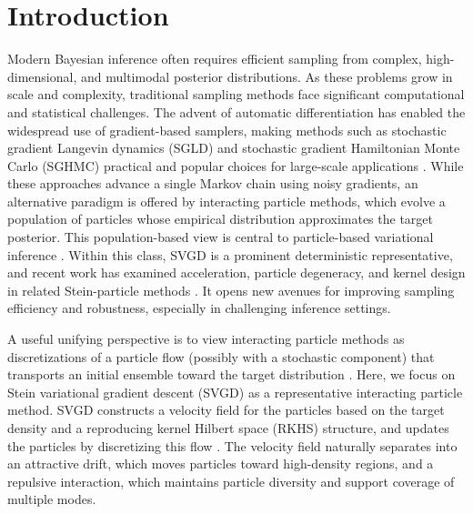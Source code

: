 \section{Introduction}

\label{sec:introduction}

Modern Bayesian inference often requires efficient sampling from complex, high-dimensional, and multimodal posterior distributions. As these problems grow in scale and complexity, traditional sampling methods face significant computational and statistical challenges. The advent of automatic differentiation has enabled the widespread use of gradient-based samplers, making methods such as stochastic gradient Langevin dynamics (SGLD) and stochastic gradient Hamiltonian Monte Carlo (SGHMC) practical and popular choices for large-scale applications \cite{welling2011sgld,chen2014sghmc}. While these approaches advance a single Markov chain using noisy gradients, an alternative paradigm is offered by interacting particle methods, which evolve a population of particles whose empirical distribution approximates the target posterior. This population-based view is central to particle-based variational inference \cite{pmlr-v97-liu19i}. Within this class, SVGD is a prominent deterministic representative, and recent work has examined acceleration, particle degeneracy, and kernel design in related Stein-particle methods \cite{pmlr-v97-liu19i,pmlr-v80-zhuo18a,wang2019matrixsvgd}. It opens new avenues for improving sampling efficiency and robustness, especially in challenging inference settings.

A useful unifying perspective is to view interacting particle methods as
discretizations of a particle flow (possibly with a stochastic component) that
transports an initial ensemble toward the target distribution \cite{Sandu_2025_EnsembleFokkerPlanck}.
Here, we focus on Stein variational gradient descent (SVGD) \cite{liu2016svgd} as a
representative interacting particle method. SVGD constructs a velocity field
for the particles based on the target density and a reproducing kernel Hilbert
space (RKHS) structure, and updates the particles by discretizing this flow \cite{liu2016svgd}.
The velocity field naturally separates into an attractive drift, which moves
particles toward high-density regions, and a repulsive interaction, which
maintains particle diversity and support coverage of multiple modes.

